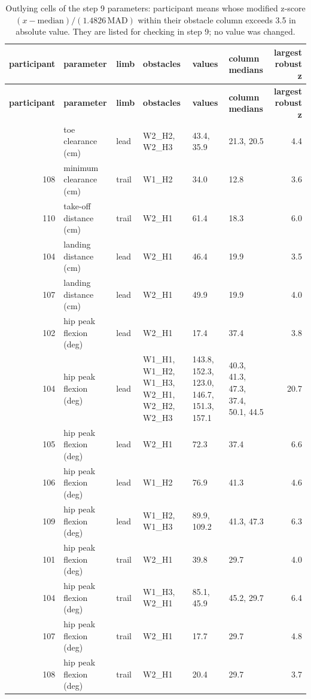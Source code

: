 \begingroup\scriptsize
\setlength{\tabcolsep}{3pt}
\begin{longtable}{@{}r p{3.3cm} l p{2.9cm} p{3.0cm} p{3.0cm} r@{}}
\caption{Outlying cells of the step 9 parameters: participant means whose modified z-score $(x - \text{median}) / (1.4826\,\text{MAD})$ within their obstacle column exceeds 3.5 in absolute value. They are listed for checking in step 9; no value was changed.}\label{tab:paramoutliers}\\
\toprule \textbf{participant} & \textbf{parameter} & \textbf{limb} & \textbf{obstacles} & \textbf{values} & \textbf{column medians} & \textbf{largest robust z} \\ \midrule \endfirsthead
\toprule \textbf{participant} & \textbf{parameter} & \textbf{limb} & \textbf{obstacles} & \textbf{values} & \textbf{column medians} & \textbf{largest robust z} \\ \midrule \endhead
\bottomrule \endfoot
108 & toe clearance (cm) & lead & W2\_H2, W2\_H3 & 43.4, 35.9 & 21.3, 20.5 & 4.4 \\
108 & minimum clearance (cm) & trail & W1\_H2 & 34.0 & 12.8 & 3.6 \\
110 & take-off distance (cm) & trail & W2\_H1 & 61.4 & 18.3 & 6.0 \\
104 & landing distance (cm) & lead & W2\_H1 & 46.4 & 19.9 & 3.5 \\
107 & landing distance (cm) & lead & W2\_H1 & 49.9 & 19.9 & 4.0 \\
102 & hip peak flexion (deg) & lead & W2\_H1 & 17.4 & 37.4 & 3.8 \\
104 & hip peak flexion (deg) & lead & W1\_H1, W1\_H2, W1\_H3, W2\_H1, W2\_H2, W2\_H3 & 143.8, 152.3, 123.0, 146.7, 151.3, 157.1 & 40.3, 41.3, 47.3, 37.4, 50.1, 44.5 & 20.7 \\
105 & hip peak flexion (deg) & lead & W2\_H1 & 72.3 & 37.4 & 6.6 \\
106 & hip peak flexion (deg) & lead & W1\_H2 & 76.9 & 41.3 & 4.6 \\
109 & hip peak flexion (deg) & lead & W1\_H2, W1\_H3 & 89.9, 109.2 & 41.3, 47.3 & 6.3 \\
101 & hip peak flexion (deg) & trail & W2\_H1 & 39.8 & 29.7 & 4.0 \\
104 & hip peak flexion (deg) & trail & W1\_H3, W2\_H1 & 85.1, 45.9 & 45.2, 29.7 & 6.4 \\
107 & hip peak flexion (deg) & trail & W2\_H1 & 17.7 & 29.7 & 4.8 \\
108 & hip peak flexion (deg) & trail & W2\_H1 & 20.4 & 29.7 & 3.7 \\

\end{longtable}
